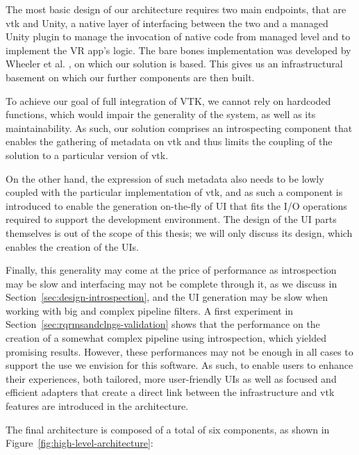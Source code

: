 The most basic design of our architecture requires two main endpoints, that are \acrshort{vtk} and Unity, a native layer of interfacing between the two and a managed Unity plugin to manage the invocation of native code from managed level and to implement the VR app's logic. The bare bones implementation was developed by Wheeler et al. \cite{wheeler_virtual_2018}, on which our solution is based. This gives us an infrastructural basement on which our further components are then built.

To achieve our goal of full integration of VTK, we cannot rely on hardcoded functions, which would impair the generality of the system, as well as its maintainability. As such, our solution comprises an introspecting component that enables the gathering of metadata on \acrshort{vtk} and thus limits the coupling of the solution to a particular version of \acrshort{vtk}.

On the other hand, the expression of such metadata also needs to be lowly coupled with the particular implementation of \acrshort{vtk}, and as such a component is introduced to enable the generation on-the-fly of UI that fits the I/O operations required to support the development environment. The design of the UI parts themselves is out of the scope of this thesis; we will only discuss its design, which enables the creation of the UIs.

Finally, this generality may come at the price of performance as introspection may be slow and interfacing may not be complete through it, as we discuss in Section~\ref{sec:design-introspection}, and the UI generation may be slow when working with big and complex pipeline filters. A first experiment in Section~\ref{sec:rqrmsandclngs-validation} shows that the performance on the creation of a somewhat complex pipeline using introspection, which yielded promising results. However, these performances may not be enough in all cases to support the use we envision for this software. As such, to enable users to enhance their experiences, both  tailored, more user-friendly UIs as well as focused and efficient adapters that create a direct link between the infrastructure and \acrshort{vtk} features are introduced in the architecture.

The final architecture is composed of a total of six components, as shown in Figure~\ref{fig:high-level-architecture}:

